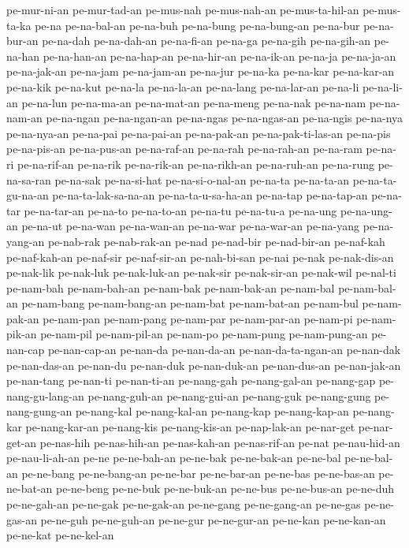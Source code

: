 {pe-mur-ni-an pe-mur-tad-an pe-mus-nah pe-mus-nah-an pe-mus-ta-hil-an
pe-mus-ta-ka pe-na pe-na-bal-an pe-na-buh pe-na-bung pe-na-bung-an
pe-na-bur pe-na-bur-an pe-na-dah pe-na-dah-an pe-na-fi-an pe-na-ga
pe-na-gih pe-na-gih-an pe-na-han pe-na-han-an pe-na-hap-an pe-na-hir-an
pe-na-ik-an pe-na-ja pe-na-ja-an pe-na-jak-an pe-na-jam pe-na-jam-an
pe-na-jur pe-na-ka pe-na-kar pe-na-kar-an pe-na-kik pe-na-kut pe-na-la
pe-na-la-an pe-na-lang pe-na-lar-an pe-na-li pe-na-li-an pe-na-lun
pe-na-ma-an pe-na-mat-an pe-na-meng pe-na-nak pe-na-nam pe-na-nam-an
pe-na-ngan pe-na-ngan-an pe-na-ngas pe-na-ngas-an pe-na-ngis pe-na-nya
pe-na-nya-an pe-na-pai pe-na-pai-an pe-na-pak-an pe-na-pak-ti-las-an
pe-na-pis pe-na-pis-an pe-na-pus-an pe-na-raf-an pe-na-rah pe-na-rah-an
pe-na-ram pe-na-ri pe-na-rif-an pe-na-rik pe-na-rik-an pe-na-rikh-an
pe-na-ruh-an pe-na-rung pe-na-sa-ran pe-na-sak pe-na-si-hat
pe-na-si-o-nal-an pe-na-ta pe-na-ta-an pe-na-ta-gu-na-an
pe-na-ta-lak-sa-na-an pe-na-ta-u-sa-ha-an pe-na-tap pe-na-tap-an pe-na-tar
pe-na-tar-an pe-na-to pe-na-to-an pe-na-tu pe-na-tu-a pe-na-ung
pe-na-ung-an pe-na-ut pe-na-wan pe-na-wan-an pe-na-war pe-na-war-an
pe-na-yang pe-na-yang-an pe-nab-rak pe-nab-rak-an pe-nad pe-nad-bir
pe-nad-bir-an pe-naf-kah pe-naf-kah-an pe-naf-sir pe-naf-sir-an
pe-nah-bi-san pe-nai pe-nak pe-nak-dis-an pe-nak-lik pe-nak-luk
pe-nak-luk-an pe-nak-sir pe-nak-sir-an pe-nak-wil pe-nal-ti pe-nam-bah
pe-nam-bah-an pe-nam-bak pe-nam-bak-an pe-nam-bal pe-nam-bal-an
pe-nam-bang pe-nam-bang-an pe-nam-bat pe-nam-bat-an pe-nam-bul
pe-nam-pak-an pe-nam-pan pe-nam-pang pe-nam-par pe-nam-par-an pe-nam-pi
pe-nam-pik-an pe-nam-pil pe-nam-pil-an pe-nam-po pe-nam-pung
pe-nam-pung-an pe-nan-cap pe-nan-cap-an pe-nan-da pe-nan-da-an
pe-nan-da-ta-ngan-an pe-nan-dak pe-nan-das-an pe-nan-du pe-nan-duk
pe-nan-duk-an pe-nan-dus-an pe-nan-jak-an pe-nan-tang pe-nan-ti
pe-nan-ti-an pe-nang-gah pe-nang-gal-an pe-nang-gap pe-nang-gu-lang-an
pe-nang-guh-an pe-nang-gui-an pe-nang-guk pe-nang-gung pe-nang-gung-an
pe-nang-kal pe-nang-kal-an pe-nang-kap pe-nang-kap-an pe-nang-kar
pe-nang-kar-an pe-nang-kis pe-nang-kis-an pe-nap-lak-an pe-nar-get
pe-nar-get-an pe-nas-hih pe-nas-hih-an pe-nas-kah-an pe-nas-rif-an pe-nat
pe-nau-hid-an pe-nau-li-ah-an pe-ne pe-ne-bah-an pe-ne-bak pe-ne-bak-an
pe-ne-bal pe-ne-bal-an pe-ne-bang pe-ne-bang-an pe-ne-bar pe-ne-bar-an
pe-ne-bas pe-ne-bas-an pe-ne-bat-an pe-ne-beng pe-ne-buk pe-ne-buk-an
pe-ne-bus pe-ne-bus-an pe-ne-duh pe-ne-gah-an pe-ne-gak pe-ne-gak-an
pe-ne-gang pe-ne-gang-an pe-ne-gas pe-ne-gas-an pe-ne-guh pe-ne-guh-an
pe-ne-gur pe-ne-gur-an pe-ne-kan pe-ne-kan-an pe-ne-kat pe-ne-kel-an
}

